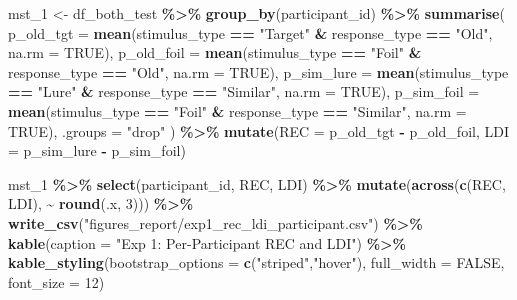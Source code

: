 \documentclass[
]{article}
\newenvironment{Shaded}{\begin{snugshade}}{\end{snugshade}}
\newcommand{\AttributeTok}[1]{\textcolor[rgb]{0.13,0.29,0.53}{#1}}
\newcommand{\ConstantTok}[1]{\textcolor[rgb]{0.56,0.35,0.01}{#1}}
\newcommand{\DecValTok}[1]{\textcolor[rgb]{0.00,0.00,0.81}{#1}}
\newcommand{\FunctionTok}[1]{\textcolor[rgb]{0.13,0.29,0.53}{\textbf{#1}}}
\newcommand{\NormalTok}[1]{#1}
\newcommand{\OtherTok}[1]{\textcolor[rgb]{0.56,0.35,0.01}{#1}}
\newcommand{\SpecialCharTok}[1]{\textcolor[rgb]{0.81,0.36,0.00}{\textbf{#1}}}
\newcommand{\StringTok}[1]{\textcolor[rgb]{0.31,0.60,0.02}{#1}}
\begin{document}
\begin{Shaded}
\begin{Highlighting}[]
\NormalTok{mst\_1 }\OtherTok{\textless{}{-}}\NormalTok{ df\_both\_test }\SpecialCharTok{\%\textgreater{}\%}
  \FunctionTok{group\_by}\NormalTok{(participant\_id) }\SpecialCharTok{\%\textgreater{}\%}
  \FunctionTok{summarise}\NormalTok{(}
    \AttributeTok{p\_old\_tgt  =} \FunctionTok{mean}\NormalTok{(stimulus\_type }\SpecialCharTok{==} \StringTok{"Target"} \SpecialCharTok{\&}\NormalTok{ response\_type }\SpecialCharTok{==} \StringTok{"Old"}\NormalTok{,     }\AttributeTok{na.rm =} \ConstantTok{TRUE}\NormalTok{),}
    \AttributeTok{p\_old\_foil =} \FunctionTok{mean}\NormalTok{(stimulus\_type }\SpecialCharTok{==} \StringTok{"Foil"}   \SpecialCharTok{\&}\NormalTok{ response\_type }\SpecialCharTok{==} \StringTok{"Old"}\NormalTok{,     }\AttributeTok{na.rm =} \ConstantTok{TRUE}\NormalTok{),}
    \AttributeTok{p\_sim\_lure =} \FunctionTok{mean}\NormalTok{(stimulus\_type }\SpecialCharTok{==} \StringTok{"Lure"}   \SpecialCharTok{\&}\NormalTok{ response\_type }\SpecialCharTok{==} \StringTok{"Similar"}\NormalTok{, }\AttributeTok{na.rm =} \ConstantTok{TRUE}\NormalTok{),}
    \AttributeTok{p\_sim\_foil =} \FunctionTok{mean}\NormalTok{(stimulus\_type }\SpecialCharTok{==} \StringTok{"Foil"}   \SpecialCharTok{\&}\NormalTok{ response\_type }\SpecialCharTok{==} \StringTok{"Similar"}\NormalTok{, }\AttributeTok{na.rm =} \ConstantTok{TRUE}\NormalTok{),}
    \AttributeTok{.groups =} \StringTok{"drop"}
\NormalTok{  ) }\SpecialCharTok{\%\textgreater{}\%}
  \FunctionTok{mutate}\NormalTok{(}\AttributeTok{REC =}\NormalTok{ p\_old\_tgt }\SpecialCharTok{{-}}\NormalTok{ p\_old\_foil,}
         \AttributeTok{LDI =}\NormalTok{ p\_sim\_lure }\SpecialCharTok{{-}}\NormalTok{ p\_sim\_foil)}

\NormalTok{mst\_1 }\SpecialCharTok{\%\textgreater{}\%} \FunctionTok{select}\NormalTok{(participant\_id, REC, LDI) }\SpecialCharTok{\%\textgreater{}\%}
  \FunctionTok{mutate}\NormalTok{(}\FunctionTok{across}\NormalTok{(}\FunctionTok{c}\NormalTok{(REC, LDI), }\SpecialCharTok{\textasciitilde{}} \FunctionTok{round}\NormalTok{(.x, }\DecValTok{3}\NormalTok{))) }\SpecialCharTok{\%\textgreater{}\%}
  \FunctionTok{write\_csv}\NormalTok{(}\StringTok{"figures\_report/exp1\_rec\_ldi\_participant.csv"}\NormalTok{) }\SpecialCharTok{\%\textgreater{}\%}
  \FunctionTok{kable}\NormalTok{(}\AttributeTok{caption =} \StringTok{"Exp 1: Per{-}Participant REC and LDI"}\NormalTok{) }\SpecialCharTok{\%\textgreater{}\%}
  \FunctionTok{kable\_styling}\NormalTok{(}\AttributeTok{bootstrap\_options =} \FunctionTok{c}\NormalTok{(}\StringTok{"striped"}\NormalTok{,}\StringTok{"hover"}\NormalTok{), }\AttributeTok{full\_width =} \ConstantTok{FALSE}\NormalTok{, }\AttributeTok{font\_size =} \DecValTok{12}\NormalTok{)}
\end{Highlighting}
\end{Shaded}
\end{document}
